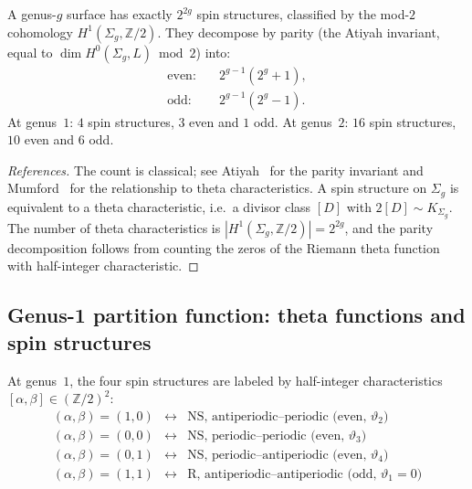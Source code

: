 \begin{proposition}
\label{prop:spin-structure-count}
A genus-$g$ surface has exactly $2^{2g}$ spin structures,
classified by the mod-$2$ cohomology
$H^1(\Sigma_g, \mathbb{Z}/2)$. They decompose by parity
\textup{(}the Atiyah invariant, equal to
$\dim H^0(\Sigma_g, L) \bmod 2$\textup{)} into:
\begin{align}
\text{even:} &\quad 2^{g-1}(2^g + 1), \\
\text{odd:} &\quad 2^{g-1}(2^g - 1).
\end{align}
At genus~$1$: $4$ spin structures, $3$ even and $1$ odd.
At genus~$2$: $16$ spin structures, $10$ even and $6$ odd.
\end{proposition}

\begin{proof}[References]
The count is classical; see Atiyah~\cite{Atiyah71} for the
parity invariant and Mumford~\cite{Mum71} for the
relationship to theta characteristics. A spin structure on
$\Sigma_g$ is equivalent to a theta characteristic, i.e.\ a
divisor class $[D]$ with $2[D] \sim K_{\Sigma_g}$. The number
of theta characteristics is $|H^1(\Sigma_g,
\mathbb{Z}/2)| = 2^{2g}$, and the parity decomposition
follows from counting the zeros of the Riemann theta function
with half-integer characteristic.
\end{proof}

\subsection{Genus-1 partition function: theta functions and spin
structures}
\label{subsec:fermion-genus1}

At genus~$1$, the four spin structures are labeled by
half-integer characteristics
$[\alpha, \beta] \in (\mathbb{Z}/2)^2$:
\[
\begin{array}{lcl}
(\alpha,\beta) = (1,0) & \longleftrightarrow &
 \text{NS, antiperiodic--periodic
 (even, } \vartheta_2\text{)} \\[2pt]
(\alpha,\beta) = (0,0) & \longleftrightarrow &
 \text{NS, periodic--periodic
 (even, } \vartheta_3\text{)} \\[2pt]
(\alpha,\beta) = (0,1) & \longleftrightarrow &
 \text{NS, periodic--antiperiodic
 (even, } \vartheta_4\text{)} \\[2pt]
(\alpha,\beta) = (1,1) & \longleftrightarrow &
 \text{R, antiperiodic--antiperiodic
 (odd, } \vartheta_1 = 0\text{)}
\end{array}
\]

